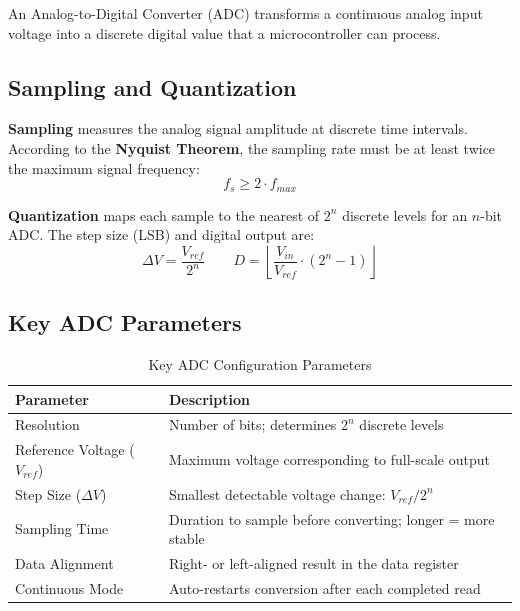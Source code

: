 \documentclass[12pt,a4paper]{article}
\begin{document}
An Analog-to-Digital Converter (ADC) transforms a continuous analog input voltage into a discrete digital value that a microcontroller can process.

\subsection{Sampling and Quantization}
\textbf{Sampling} measures the analog signal amplitude at discrete time intervals. According to the \textbf{Nyquist Theorem}, the sampling rate must be at least twice the maximum signal frequency:
\begin{equation}
    f_s \geq 2 \cdot f_{max}
\end{equation}

\textbf{Quantization} maps each sample to the nearest of $2^n$ discrete levels for an $n$-bit ADC. The step size (LSB) and digital output are:
\begin{equation}
    \Delta V = \frac{V_{ref}}{2^n}
    \qquad
    D = \left\lfloor \frac{V_{in}}{V_{ref}} \cdot (2^n - 1) \right\rfloor
\end{equation}

\subsection{Key ADC Parameters}

\begin{table}[H]
\centering
\begin{tabular}{ll}
\toprule
\textbf{Parameter} & \textbf{Description} \\
\midrule
Resolution         & Number of bits; determines $2^n$ discrete levels \\
Reference Voltage ($V_{ref}$)  & Maximum voltage corresponding to full-scale output \\
Step Size ($\Delta V$) & Smallest detectable voltage change: $V_{ref}/2^n$ \\
Sampling Time       & Duration to sample before converting; longer = more stable \\
Data Alignment     & Right- or left-aligned result in the data register \\
Continuous Mode    & Auto-restarts conversion after each completed read \\
\bottomrule
\end{tabular}
\caption{Key ADC Configuration Parameters}
\end{table}

\end{document}
